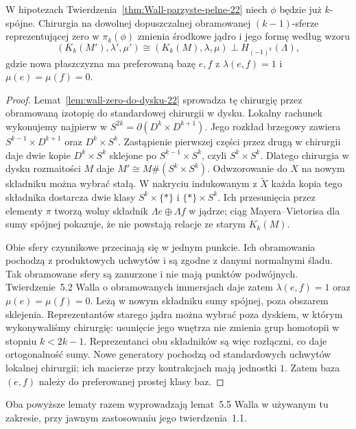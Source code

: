 \begin{lemat}
\label{lem:wall-lokalna-stabilizacja-22}
W hipotezach Twierdzenia~\ref{thm:Wall-parzyste-pelne-22}
niech $\phi$ będzie już $k$-spójne. Chirurgia na
dowolnej dopuszczalnej obramowanej $(k-1)$-sferze
reprezentującej zero w $\pi_k(\phi)$ zmienia środkowe
jądro i jego formę według wzoru
\[
 (K_k(M'),\lambda',\mu')
 \cong (K_k(M),\lambda,\mu)
       \perp H_{(-1)^k}(\Lambda),
\]
gdzie nowa płaszczyzna ma preferowaną bazę
$e,f$ z $\lambda(e,f)=1$ i
$\mu(e)=\mu(f)=0$.
\end{lemat}
\begin{proof}
Lemat~\ref{lem:wall-zero-do-dysku-22} sprowadza
tę chirurgię przez obramowaną izotopię do
standardowej chirurgii w dysku.
Lokalny rachunek wykonujemy najpierw w
$S^{2k}=\partial(D^k\times D^{k+1})$.
Jego rozkład brzegowy zawiera
$S^{k-1}\times D^{k+1}$ oraz
$D^k\times S^k$. Zastąpienie pierwszej
części przez drugą w chirurgii daje
dwie kopie $D^k\times S^k$ sklejone po
$S^{k-1}\times S^k$, czyli
$S^k\times S^k$. Dlatego chirurgia w
dysku rozmaitości $M$ daje
$M'\cong M\#(S^k\times S^k)$.
Odwzorowanie do $X$ na nowym składniku można
wybrać stałą. W nakryciu indukowanym
z $\widetilde X$ każda kopia tego
składnika dostarcza dwie klasy
$S^k\times\{*\}$ i $\{*\}\times S^k$.
Ich przesunięcia przez elementy $\pi$
tworzą wolny składnik
$\Lambda e\oplus\Lambda f$ w jądrze;
ciąg Mayera--Vietorisa dla sumy
spójnej pokazuje, że nie powstają
relacje ze starym $K_k(M)$.

Obie sfery czynnikowe przecinają się
w jednym punkcie. Ich obramowania pochodzą
z produktowych uchwytów i są zgodne
z danymi normalnymi śladu. Tak obramowane
sfery są zanurzone i nie mają punktów podwójnych.
Twierdzenie~5.2 Walla
o obramowanych immersjach daje zatem
$\lambda(e,f)=1$ oraz $\mu(e)=\mu(f)=0$.
Leżą w nowym składniku sumy spójnej, poza obszarem
sklejenia. Reprezentantów starego jądra można wybrać
poza dyskiem, w którym wykonywaliśmy chirurgię:
usunięcie jego wnętrza nie zmienia grup homotopii
w stopniu $k<2k-1$. Reprezentanci obu składników
są więc rozłączni, co daje ortogonalność sumy.
Nowe generatory pochodzą od
standardowych uchwytów lokalnej
chirurgii; ich macierze przy
kontrakcjach mają jednostki $1$.
Zatem baza $(e,f)$ należy do
preferowanej prostej klasy baz.
\end{proof}

Oba powyższe lematy razem wyprowadzają
lemat~5.5 Walla w używanym tu zakresie,
przy jawnym zastosowaniu jego twierdzenia~1.1.

